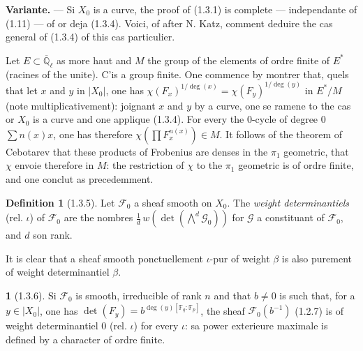 \documentclass[12pt,a4paper]{article}
\theoremstyle{plain}
\theoremstyle{definition}
\newtheorem{definition}[theorem]{Definition}
\theoremstyle{definition}
\newtheorem{para}{}[section]
\theoremstyle{remark}
\begin{document}
\textbf{Variante.} --- Si $X_0$ is a curve, the proof of (1.3.1) is complete --- independante of (1.11) --- of or deja (1.3.4). Voici, of after N. Katz, comment deduire the cas general of (1.3.4) of this cas particulier.

Let $E \subset \overline{\mathbb{Q}}_\ell$ as more haut and $M$ the group of the elements of ordre finite of $E^*$ (racines of the unite). C'is a group finite. One commence by montrer that, quels that let $x$ and $y$ in $|X_0|$, one has $\chi(F_x)^{1/\deg(x)} = \chi(F_y)^{1/\deg(y)}$ in $E^*/M$ (note multiplicativement): joignant $x$ and $y$ by a curve, one se ramene to the cas or $X_0$ is a curve and one applique (1.3.4). For every the $0$-cycle of degree $0$ $\sum n(x)x$, one has therefore $\chi(\prod F_x^{n(x)}) \in M$. It follows of the theorem of Cebotarev that these products of Frobenius are denses in the $\pi_1$ geometric, that $\chi$ envoie therefore in $M$: the restriction of $\chi$ to the $\pi_1$ geometric is of ordre finite, and one conclut as precedemment.

\begin{definition}[1.3.5]
Let $\mathscr{F}_0$ a sheaf smooth on $X_0$. The \emph{weight determinantiels} (rel. $\iota$) of $\mathscr{F}_0$ are the nombres $\frac{1}{d}\,w(\det(\bigwedge^d \mathscr{G}_0))$ for $\mathscr{G}$ a constituant of $\mathscr{F}_0$, and $d$ son rank.

It is clear that a sheaf smooth ponctuellement $\iota$-pur of weight $\beta$ is also purement of weight determinantiel $\beta$.
\end{definition}

\begin{para}[1.3.6]
Si $\mathscr{F}_0$ is smooth, irreducible of rank $n$ and that $b \neq 0$ is such that, for a $y \in |X_0|$, one has $\det(F_y) = b^{\deg(y)[\mathbb{F}_q : \mathbb{F}_p]}$, the sheaf $\mathscr{F}_0(b^{-1})$ (1.2.7) is of weight determinantiel $0$ (rel. $\iota$) for every $\iota$: sa power exterieure maximale is defined by a character of ordre finite.
\end{para}
\end{document}
